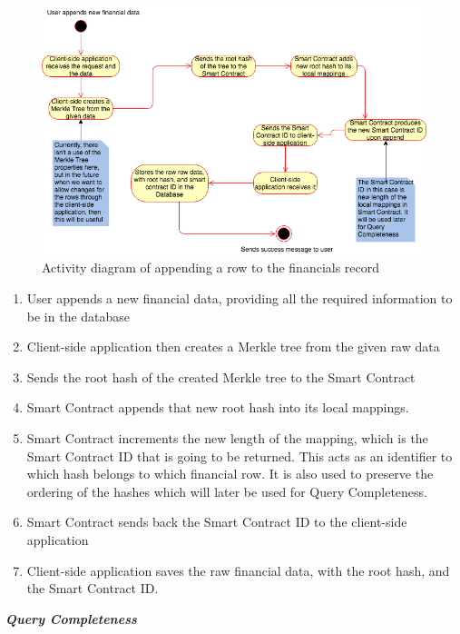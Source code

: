 \begin{figure}[h]%
\centering
\includegraphics[width=1.0\textwidth]{images/appendRowFinancials.png}
\caption{\label{fig:appendRowFinancials}Activity diagram of appending a row to the financials record}
\end{figure}

\begin{enumerate}
\item User appends a new financial data, providing all the required information to be in the database
\item Client-side application then creates a Merkle tree from the given raw data
\item Sends the root hash of the created Merkle tree to the Smart Contract
\item Smart Contract appends that new root hash into its local mappings.
\item Smart Contract increments the new length of the mapping, which is the Smart Contract ID that is going to be returned. This acts as an identifier to which hash belongs to which financial row. It is also used to preserve the ordering of the hashes which will later be used for Query Completeness.
\item Smart Contract sends back the Smart Contract ID to the client-side application
\item Client-side application saves the raw financial data, with the root hash, and the Smart Contract ID.
\end{enumerate}

\textbf{\textit{Query Completeness}}


